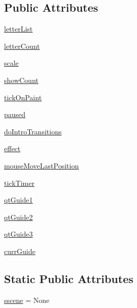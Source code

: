 \subsection*{Public Attributes}
\begin{DoxyCompactItemize}
\item 
\hyperlink{classitemcircleanimation_1_1ItemCircleAnimation_a024e1edfc3e872cb44a627d170d3b46d}{letter\+List}
\item 
\hyperlink{classitemcircleanimation_1_1ItemCircleAnimation_a9704fe2bc08deec020f70369cca7486f}{letter\+Count}
\item 
\hyperlink{classitemcircleanimation_1_1ItemCircleAnimation_aa38774ee391cd336c4a27d3281fc2339}{scale}
\item 
\hyperlink{classitemcircleanimation_1_1ItemCircleAnimation_af18b4e3d7ce5b64ce35789d9075646c2}{show\+Count}
\item 
\hyperlink{classitemcircleanimation_1_1ItemCircleAnimation_afb5cea7b8494a565c451ac49289084a6}{tick\+On\+Paint}
\item 
\hyperlink{classitemcircleanimation_1_1ItemCircleAnimation_a7221875817b94802751b0ec87e8a9a90}{paused}
\item 
\hyperlink{classitemcircleanimation_1_1ItemCircleAnimation_a82dae1ba8468a9981bafc3982c8292f8}{do\+Intro\+Transitions}
\item 
\hyperlink{classitemcircleanimation_1_1ItemCircleAnimation_ab0821e46a8b3b382b77b04d9487cdcd0}{effect}
\item 
\hyperlink{classitemcircleanimation_1_1ItemCircleAnimation_a1ba3ac1ad64002c27e560fbb9b4c94ba}{mouse\+Move\+Last\+Position}
\item 
\hyperlink{classitemcircleanimation_1_1ItemCircleAnimation_a0fd1e2d63c311699345fbc46278bfadc}{tick\+Timer}
\item 
\hyperlink{classitemcircleanimation_1_1ItemCircleAnimation_aa8d14adeee4caeda45004cc1507e14ac}{qt\+Guide1}
\item 
\hyperlink{classitemcircleanimation_1_1ItemCircleAnimation_a341c79a8aee94f9dec1f3ce128972a06}{qt\+Guide2}
\item 
\hyperlink{classitemcircleanimation_1_1ItemCircleAnimation_aad7c0b94ef12d9a922c9eb2499239bc9}{qt\+Guide3}
\item 
\hyperlink{classitemcircleanimation_1_1ItemCircleAnimation_aa995e1094040162ee4ec4651ee0e35a6}{curr\+Guide}
\end{DoxyCompactItemize}
\subsection*{Static Public Attributes}
\begin{DoxyCompactItemize}
\item 
\hyperlink{classitemcircleanimation_1_1ItemCircleAnimation_afd77794fe3702eaaa88fd37ce2137844}{sscene} = None
\end{DoxyCompactItemize}
